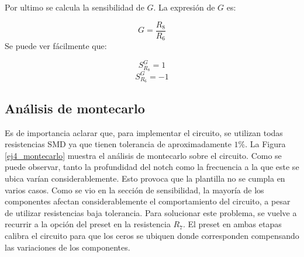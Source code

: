 Por ultimo se calcula la sensibilidad de $G$. La expresión de $G$ es:

\begin{displaymath}  G = \frac{R_8}{R_6}\end{displaymath}
Se puede ver fácilmente que:
    
\begin{displaymath}  S^{G}_{R_8} = 1\end{displaymath}
\begin{displaymath}  S^{G}_{R_6} = -1\end{displaymath}


\subsection{Análisis de montecarlo}

Es de importancia aclarar que, para implementar el circuito, se utilizan todas resistencias SMD ya que tienen tolerancia de aproximadamente $1\%$. La Figura \ref{ej4_montecarlo} muestra el análisis de montecarlo sobre el circuito. Como se puede observar, tanto la profundidad del notch como la frecuencia a la que este se ubica varían considerablemente. Esto provoca que la plantilla no se cumpla en varios casos. Como se vio en la sección de sensibilidad, la mayoría de los componentes afectan considerablemente el comportamiento del circuito, a pesar de utilizar resistencias baja tolerancia. Para solucionar este problema, se vuelve a recurrir a la opción del preset en la resistencia $R_7$. El preset en ambas etapas calibra el circuito para que los ceros se ubiquen donde corresponden compensando las variaciones de los componentes. 


